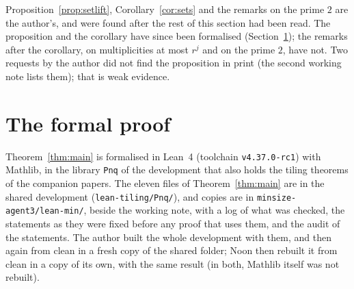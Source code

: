 \documentclass[11pt,a4paper]{amsart}
\theoremstyle{definition}
\theoremstyle{remark}
\newcommand{\lean}[1]{\texttt{#1}}
\begin{document}
Proposition~\ref{prop:setlift}, Corollary~\ref{cor:sets} and the remarks on the prime $2$ are the author's, and were found after the rest of this section had been read. The proposition and the corollary have since been formalised (Section~\ref{sec:lean}); the remarks after the corollary, on multiplicities at most $r^j$ and on the prime $2$, have not. Two requests by the author did not find the
proposition in print (the second working note lists them); that is weak evidence.

\section{The formal proof}\label{sec:lean}

Theorem~\ref{thm:main} is formalised in Lean~4 (toolchain \lean{v4.37.0-rc1}) with Mathlib, in the library
\lean{Pnq} of the development that also holds the tiling theorems of the companion papers. The eleven files of Theorem~\ref{thm:main} are in the shared development (\lean{lean-tiling/Pnq/}), and copies are in
\lean{minsize-agent3/lean-min/}, beside the working note, with a log of what was checked, the statements as they were fixed before any proof that uses them, and the audit of the statements. The author
built the whole development with them, and then again from clean in a fresh copy of the shared folder; Noon then rebuilt it from clean in a copy of its own, with the same result (in both, Mathlib itself was not rebuilt).
\end{document}
